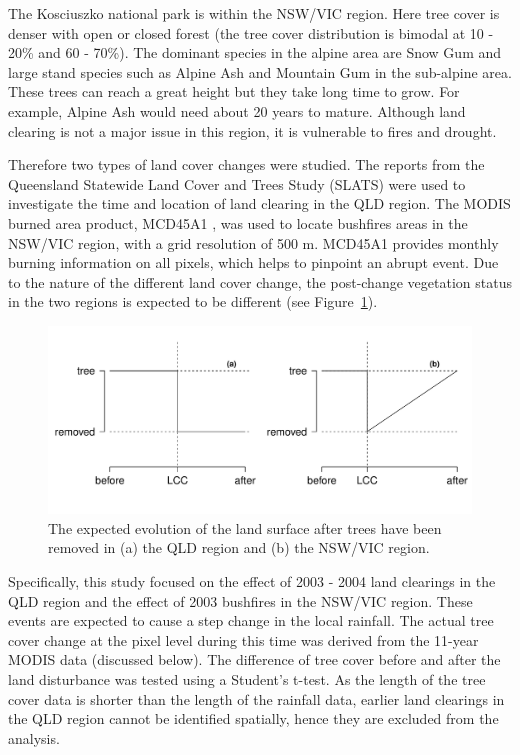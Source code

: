 \documentclass[onecolumn,referee]{svjour3}
\begin{document}
The Kosciuszko national park is within the NSW/VIC region. Here tree cover is denser with open or closed forest (the tree cover distribution is bimodal at 10 - 20\% and 60 - 70\%). The dominant species in the alpine area are Snow Gum and large stand species such as Alpine Ash and Mountain Gum in the sub-alpine area. These trees can reach a great height but they take long time to grow. For example, Alpine Ash would need about 20 years to mature. Although land clearing is not a major issue in this region, it is vulnerable to fires and drought. 

Therefore two types of land cover changes were studied. The reports from the Queensland Statewide Land Cover and Trees Study (SLATS) \citep[e.g.][]{SLATS2001,SLATS2003} were used to investigate the time and location of land clearing in the QLD region. The MODIS burned area product, MCD45A1 \citep{Roy2002,Roy2005,Roy2008}, was used to locate bushfires areas in the NSW/VIC region, with a grid resolution of 500 m. MCD45A1 provides monthly burning information on all pixels, which helps to pinpoint an abrupt event. Due to the nature of the different land cover change, the post-change vegetation status in the two regions is expected to be different (see Figure~\ref{fig:tc_simple}). 

\begin{figure}[ht!]
  \centerline{\includegraphics[scale=0.65]{tc_simple.pdf}}
  \caption{The expected evolution of the land surface after trees have been removed in (a) the QLD region and (b) the NSW/VIC region.}
  \label{fig:tc_simple}
\end{figure}

Specifically, this study focused on the effect of 2003 - 2004 land clearings in the QLD region and the effect of 2003 bushfires in the NSW/VIC region. These events are expected to cause a step change in the local rainfall. The actual tree cover change at the pixel level during this time was derived from the 11-year MODIS data (discussed below). The difference of tree cover before and after the land disturbance was tested using a Student's t-test. As the length of the tree cover data is shorter than the length of the rainfall data, earlier land clearings in the QLD region cannot be identified spatially, hence they are excluded from the analysis.
\end{document}
